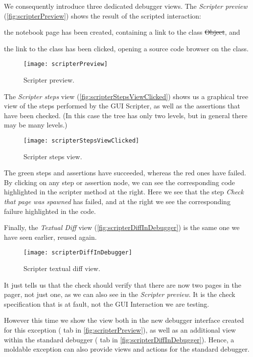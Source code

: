 \documentclass[sigplan,anonymous,review,10pt]{acmart}
\newcommand{\GT}{\lst{GT}\xspace} %
\begin{document}
We consequently introduce three dedicated debugger views.
The \emph{Scripter preview} (\autoref{fig:scripterPreview}) shows the result of the scripted interaction:
\begin{inparaenum}[(i)]
	\item the notebook page has been created, containing a link to the class \st{Object}, and
	\item the link to the class has been clicked, opening a source code browser on the class.
\end{inparaenum}
\begin{figure}[h]
  \texttt{[image: scripterPreview]}
  \caption{Scripter preview.}
  \label{fig:scripterPreview}
\end{figure}

The \emph{Scripter steps} view (\autoref{fig:scripterStepsViewClicked}) shows us a graphical tree view of the steps performed by the GUI Scripter, as well as the assertions that have been checked.
(In this case the tree has only two levels, but in general there may be many levels.)
\begin{figure}[h]
  \texttt{[image: scripterStepsViewClicked]}
  \caption{Scripter steps view.}
  \label{fig:scripterStepsViewClicked}
\end{figure}
The green steps and assertions have succeeded, whereas the red ones have failed.
By clicking on any step or assertion node, we can see the corresponding code highlighted in the scripter method at the right.
Here we see that the step \emph{Check that page was spawned} has failed, and at the right we see the corresponding failure highlighted in the code.

Finally, the \emph{Textual Diff} view (\autoref{fig:scripterDiffInDebugger}) is the same one we have seen earlier, reused again.
\begin{figure}[h]
  \texttt{[image: scripterDiffInDebugger]}
  \caption{Scripter textual diff view.}
  \label{fig:scripterDiffInDebugger}
\end{figure}
It just tells us that the check should verify that there are now two pages in the pager, not just one, as we can also see in the \emph{Scripter preview}.
It is the check specification that is at fault, not the GUI Interaction we are testing.

However this time we show the  view both in the new debugger interface created for this exception ( tab in \autoref{fig:scripterPreview}), as well as an additional view within the standard \GT debugger ( tab in \autoref{fig:scripterDiffInDebugger}).
Hence, a moldable exception can also provide views and actions for the standard \GT debugger.
\end{document}
